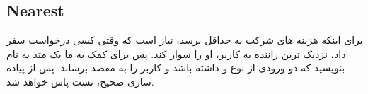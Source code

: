 \subsection{Nearest}
برای اینکه هزینه های شرکت به حداقل برسد، نیاز است که وقتی کسی درخواست سفر داد، نزدیک ترین راننده به کاربر، او را سوار کند.
پس برای کمک به ما یک متد به نام
\grayBox{\textcolor{blue}{NearestDriver}}
بنویسید که دو ورودی از نوع
\grayBox{\textcolor{blue}{Customer}}
و 
\grayBox{\textcolor{blue}{Place}}
داشته باشد و کاربر را به مقصد برساند.
 پس از پیاده سازی صحیح، تست
\grayBox{\textcolor{dkgreen}{NearestTest}}
پاس خواهد شد.